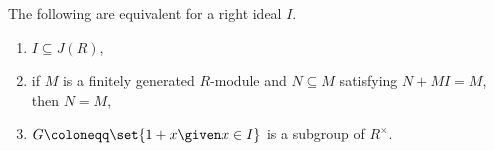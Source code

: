 The following are equivalent for a right ideal $I$.
\begin{enumerate}
	\item $I \subseteq J(R)$,
	\item if $M$ is a finitely generated $R$-module and $N \subseteq M$
		satisfying $N+MI = M$, then $N = M$,
	\item $G\coloneqq \set{1 + x\given x \in I}$ is a subgroup of $R^\times$.
\end{enumerate}
